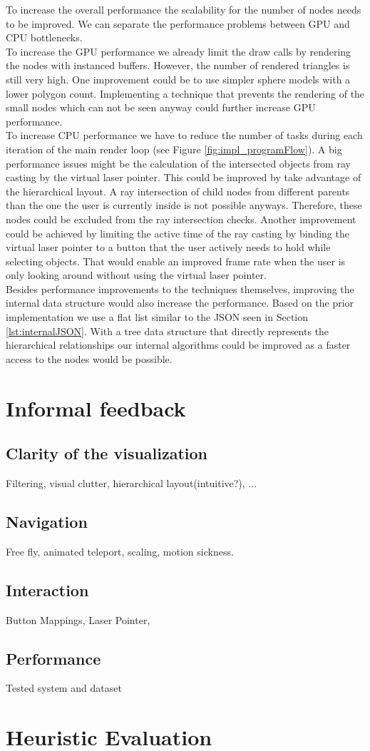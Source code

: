 To increase the overall performance the scalability for the number of nodes needs to be improved. We can separate the performance problems between GPU and CPU bottlenecks.
\\
To increase the GPU performance we already limit the draw calls by rendering the nodes with instanced buffers.
However, the number of rendered triangles is still very high. 
One improvement could be to use simpler sphere models with a lower polygon count. Implementing a technique that prevents the rendering of the small nodes which can not be seen anyway could further increase GPU performance.
\\
To increase CPU performance we have to reduce the number of tasks during each iteration of the main render loop (see Figure \ref{fig:impl_programFlow}).
A big performance issues might be the calculation of the intersected objects from ray casting by the virtual laser pointer. This could be improved by take advantage of the hierarchical layout. A ray intersection of child nodes from different parents than the one the user is currently inside is not possible anyways. Therefore, these nodes could be excluded from the ray intersection checks. 
Another improvement could be achieved by limiting the active time of the ray casting by binding the virtual laser pointer to a button that the user actively needs to hold while selecting objects. 
That would enable an improved frame rate when the user is only looking around without using the virtual laser pointer.
\\
Besides performance improvements to the techniques themselves, improving the internal data structure would also increase the performance. Based on the prior implementation we use a flat list similar to the JSON seen in Section \ref{lst:internalJSON}. With a tree data structure that directly represents the hierarchical relationships our internal algorithms could be improved as a faster access to the nodes would be possible.

\section{Informal feedback}
\label{sec:informalFeedback}

\subsection{Clarity of the visualization}
Filtering, visual clutter, hierarchical layout(intuitive?), ...

\subsection{Navigation}
Free fly, animated teleport, scaling, motion sickness.

\subsection{Interaction}
Button Mappings, Laser Pointer, 

\subsection{Performance}
Tested system and dataset

\section{Heuristic Evaluation}
\label{sec:heuristicEvaluation}
